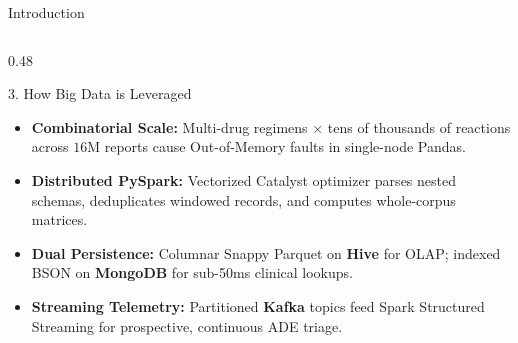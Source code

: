 \documentclass[11pt, aspectratio=169]{beamer}
\begin{document}
\begin{frame}{Introduction}
\begin{columns}[T]
        \begin{column}{0.48\textwidth}
            \begin{exampleblock}{\footnotesize 3. How Big Data is Leveraged}
                \begin{itemize}\scriptsize
                    \item \textbf{Combinatorial Scale:} Multi-drug regimens $\times$ tens of thousands of reactions across $16\text{M}$ reports cause Out-of-Memory faults in single-node Pandas.
                    \item \textbf{Distributed PySpark:} Vectorized Catalyst optimizer parses nested schemas, deduplicates windowed records, and computes whole-corpus matrices.
                    \item \textbf{Dual Persistence:} Columnar Snappy Parquet on \textbf{Hive} for OLAP; indexed BSON on \textbf{MongoDB} for sub-50ms clinical lookups.
                    \item \textbf{Streaming Telemetry:} Partitioned \textbf{Kafka} topics feed Spark Structured Streaming for prospective, continuous ADE triage.
                \end{itemize}
            \end{exampleblock}
        \end{column}
    \end{columns}
\end{frame}
\end{document}

